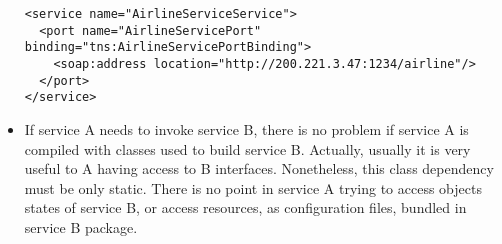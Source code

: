 \documentclass[a4paper, 10pt]{article}
\begin{document}
\begin{itemize}
{\footnotesize
\begin{lstlisting}[caption=Good example of service port address on a WSDL file, 
label=lst:wsdl_address] 
<service name="AirlineServiceService">
  <port name="AirlineServicePort" binding="tns:AirlineServicePortBinding">
    <soap:address location="http://200.221.3.47:1234/airline"/>
  </port>
</service>
\end{lstlisting}
}

\item If service A needs to invoke service B, there is no problem if service A is compiled with classes used to build service B. Actually, usually it is very useful to A having access to B interfaces. Nonetheless, this class dependency must be only static. There is no point in service A trying to access objects states of service B, or access resources, as configuration files, bundled in service B package.

\end{itemize}
\end{document}
